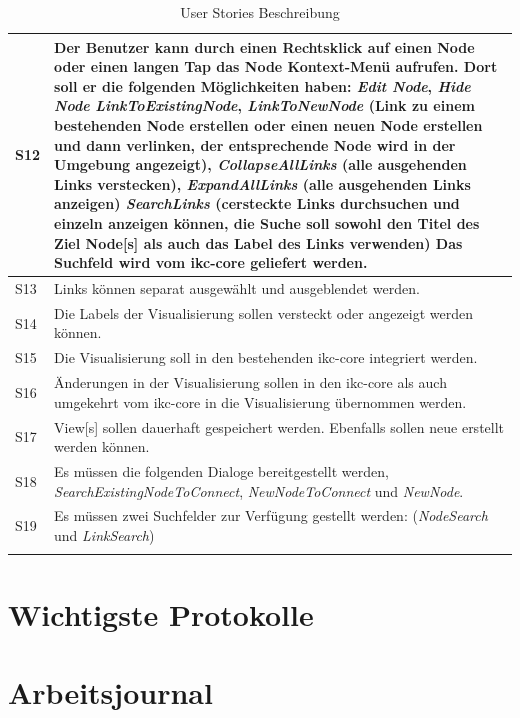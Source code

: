 \begin{longtable}{|p{1cm} | p{10.8cm} |}
S12 & Der Benutzer kann durch einen Rechtsklick auf einen \gls{Node} oder einen langen Tap das \gls{Node} Kontext-Menü aufrufen. Dort soll er die folgenden Möglichkeiten haben: \textit{Edit Node}, \textit{Hide Node} \textit{LinkToExistingNode}, \textit{LinkToNewNode} (Link zu einem bestehenden \gls{Node} erstellen oder einen neuen \gls{Node} erstellen und dann verlinken, der entsprechende \gls{Node} wird in der Umgebung angezeigt), \textit{CollapseAllLinks} (alle ausgehenden Links verstecken), \textit{ExpandAllLinks} (alle ausgehenden Links anzeigen) \textit{SearchLinks} (cersteckte Links durchsuchen und einzeln anzeigen können, die Suche soll sowohl den Titel des Ziel \gls{Node}[s] als auch das Label des Links verwenden) Das Suchfeld wird vom \gls{ikc-core} geliefert werden. \\ \hline
S13 & Links können separat ausgewählt und ausgeblendet werden.  \\ \hline
S14 & Die Labels der Visualisierung sollen versteckt oder angezeigt werden können.\\ \hline
S15 & Die Visualisierung soll in den bestehenden \gls{ikc-core} integriert werden. \\ \hline
S16 & Änderungen in der Visualisierung sollen in den \gls{ikc-core} als auch umgekehrt vom \gls{ikc-core} in die Visualisierung übernommen werden. \\ \hline
S17 & \gls{View}[s] sollen dauerhaft gespeichert werden. Ebenfalls sollen neue erstellt werden können.          \\ \hline
S18 & Es müssen die folgenden Dialoge bereitgestellt werden, \textit{SearchExistingNodeToConnect}, \textit{NewNodeToConnect} und \textit{NewNode}.\\ \hline
S19 & Es müssen zwei Suchfelder zur Verfügung gestellt werden: (\textit{NodeSearch} und \textit{LinkSearch})\\ \hline
    \caption{User Stories Beschreibung}
\label{user-stories-desc}
\end{longtable}

\section{Wichtigste Protokolle}
\label{protokolle}


\section{Arbeitsjournal}
\label{arbeitsjournal}

